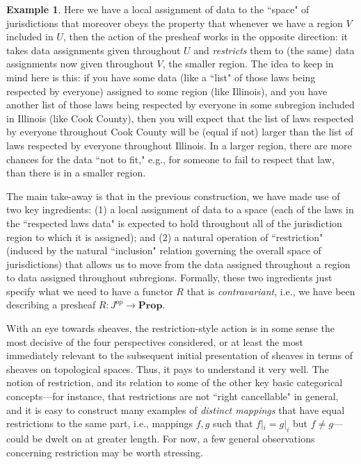 \documentclass[11pt]{book}
\theoremstyle{definition}
\newtheorem{example}{Example}[section]
\theoremstyle{definition}
\theoremstyle{definition}
\theoremstyle{theorem}
\theoremstyle{definition}
\begin{document}
\begin{example}
Here we have a local assignment of data to the ``space" of jurisdictions that moreover obeys the property that whenever we have a region $V$ included in $U$, then the action of the presheaf works in the opposite direction: it takes data assignments given throughout $U$ and \textit{restricts} them to (the same) data assignments now given throughout $V$, the smaller region. The idea to keep in mind here is this: if you have some data (like a ``list" of those laws being respected by everyone) assigned to some region (like Illinois), and you have another list of those laws being respected by everyone in some subregion included in Illinois (like Cook County), then you will expect that the list of laws respected by everyone throughout Cook County will be (equal if not) larger than the list of laws respected by everyone throughout Illinois. In a larger region, there are more chances for the data ``not to fit," e.g., for someone to fail to respect that law, than there is in a smaller region.\par   
The main take-away is that in the previous construction, we have made use of two key ingredients: (1) a local assignment of data to a space (each of the laws in the ``respected laws data" is expected to hold throughout all of the jurisdiction region to which it is assigned); and (2) a natural operation of ``restriction" (induced by the natural ``inclusion" relation governing the overall space of jurisdictions) that allows us to move from the data assigned throughout a region to data assigned throughout subregions. Formally, these two ingredients just specify what we need to have a functor $R$ that is \textit{contravariant}, i.e., we have been describing a presheaf $R: J^{op} \rightarrow \textbf{Prop}$.
	\end{example} 
With an eye towards sheaves, the restriction-style action is in some sense the most decisive of the four perspectives considered, or at least the most immediately relevant to the subsequent initial presentation of sheaves in terms of sheaves on topological spaces. Thus, it pays to understand it very well. The notion of restriction, and its relation to some of the other key basic categorical concepts---for instance, that restrictions are not ``right cancellable" in general, and it is easy to construct many examples of \textit{distinct mappings} that have equal restrictions to the same part, i.e., mappings $f, g$ such that $f|_i = g|_i$ but $f \neq g$---could be dwelt on at greater length. For now, a few general observations concerning restriction may be worth stressing.\par 
\end{document}
